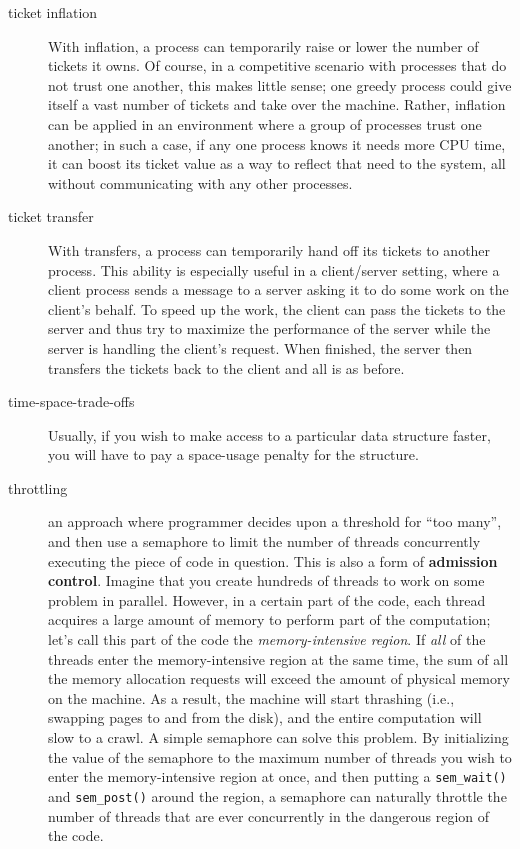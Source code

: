 \begin{description}
\item[ticket inflation] With inflation, a process can temporarily raise or lower the number of tickets it owns. Of course, in a competitive scenario with processes that do not trust one another, this makes little sense; one greedy process could give itself a vast number of tickets and take over the machine. Rather, inflation can be applied in an environment where a group of processes trust one another; in such a case, if any one process knows it needs more CPU time, it can boost its ticket value as a way to reflect that need to the system, all without communicating with any other processes.

\item[ticket transfer] With transfers, a process can temporarily hand off its tickets to another process. This ability is especially useful in a client/server setting, where a client process sends a message to a server asking it to do some work on the client’s behalf. To speed up the work, the client can pass the tickets to the server and thus try to maximize the performance of the server while the server is handling the client’s request. When finished, the server then transfers the tickets back to the client and all is as before.

\item[time-space-trade-offs] Usually, if you wish to make access to a particular data structure faster, you will have to pay a space-usage penalty for the structure.

\item[throttling] an approach where programmer decides upon a threshold for ``too many'', and then use a semaphore to limit the number of threads concurrently executing the piece of code in question.  This is also a form of \textbf{admission control}. Imagine that you create hundreds of threads to work on some problem in parallel. However, in a certain part of the code, each thread acquires a large amount of memory to perform part of the computation; let’s call this part of the code the \emph{memory-intensive region}. If \emph{all} of the threads enter the memory-intensive region at the same time, the sum of all the memory allocation requests will exceed the amount of physical memory on the machine. As a result, the machine will start thrashing (i.e., swapping pages to and from the disk), and the entire computation will slow to a crawl.  A simple semaphore can solve this problem. By initializing the value of the semaphore to the maximum number of threads you wish to enter the memory-intensive region at once, and then putting a \texttt{sem\_wait()} and \texttt{sem\_post()} around the region, a semaphore can naturally throttle the number of threads that are ever concurrently in the dangerous region of the code.


\end{description}
